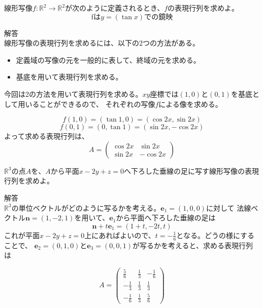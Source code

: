 \documentclass{jlreq}
\begin{document}
\begin{problem}
  線形写像$f: \mathbb{R}^2 \to \mathbb{R}^2$が次のように定義されるとき、$f$の表現行列を求めよ。
  \begin{equation*}
    \text{fは}y = (\tan x) \text{での鏡映}
  \end{equation*}
  \dotfill

  解答 \\
  線形写像の表現行列を求めるには、以下の2つの方法がある。
  \begin{itemize}
    \item 定義域の写像の元を一般的に表して、終域の元を求める。
    \item 基底を用いて表現行列を求める。
  \end{itemize}

  今回は2の方法を用いて表現行列を求める。$xy$座標では$(1, 0)$と$(0, 1)$を基底として用いることができるので、
  それぞれの写像$f$による像を求める。

  \begin{equation*}
    f(1, 0) = (\tan 1, 0) = (\cos 2 x, \sin 2 x)
  \end{equation*}
  \begin{equation*}
    f(0, 1) = (0, \tan 1) = (\sin 2 x, -\cos 2 x)
  \end{equation*}
  よって求める表現行列は、
  \begin{equation*}
    A = \begin{pmatrix}
      \cos 2 x & \sin 2 x \\
      \sin 2 x & -\cos 2 x
    \end{pmatrix}
  \end{equation*}
\end{problem}

\begin{problem}
  $\mathbb{R}^3$の点$A$を、$A$から平面$x - 2y + z = 0$へ下ろした垂線の足に写す線形写像の表現行列を求めよ。
  \dotfill

  解答 \\
  $\mathbb{R}^3$の単位ベクトルがどのように写るかを考える。$\boldsymbol{e}_1 = (1, 0, 0)$に対して
  法線ベクトル$\boldsymbol{n} = (1, -2, 1)$を用いて、$\boldsymbol{e}_1$から平面へ下ろした垂線の足は
  \begin{equation*}
    \boldsymbol{n} + t \boldsymbol{e}_1 = (1 + t, -2t, t)
  \end{equation*}
  これが平面$x - 2y + z = 0$上にあればよいので、$t = -\frac{1}{6}$となる。どうの様にすることで、
  $\boldsymbol{e}_2 = (0, 1, 0)$と$\boldsymbol{e}_3 = (0, 0, 1)$が写るかを考えると、求める表現行列は

  \begin{equation*}
    A = \begin{pmatrix}
      \frac{5}{6} & \frac{1}{3} & -\frac{1}{6} \\
      -\frac{1}{3} & \frac{1}{3} & \frac{1}{3} \\
      -\frac{1}{6} & \frac{1}{3} & \frac{5}{6}
    \end{pmatrix}
  \end{equation*}
\end{problem}
\end{document}
